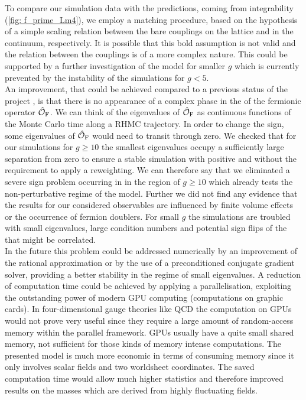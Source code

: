To compare our simulation data with the predictions, coming from integrability (\autoref{fig: f_prime_Lm4}), we employ a matching procedure, based on the hypothesis of a simple scaling relation between the bare couplings on the lattice and in the continuum, respectively. It is possible that this bold assumption is not valid and the relation between the couplings is of a more complex nature. This could be supported by a further investigation of the model for smaller $g$ which is currently prevented by the instability of the simulations for $g <5$.\\
An improvement, that could be achieved compared to a previous status of the project \cite{Bianchi:2016cyv}, is that there is no appearance of a complex phase in the  of the fermionic operator $\hat{\mathcal{O}}_{\rm F}$. We can think of the eigenvalues of $\hat{\mathcal{O}}_{\rm F}$ as continuous functions of the Monte Carlo time along a RHMC trajectory. In order to change the  sign, some eigenvalues of $\hat{\mathcal{O}}_{\rm F}$ would need to transit through zero. We checked that for our simulations for $g \geq 10$ the smallest eigenvalues occupy a sufficiently large separation from zero to ensure  a stable simulation with positive  and without the requirement to apply a reweighting. We can therefore say that we eliminated a severe sign problem occurring  in \cite{Bianchi:2016cyv} in the region of $g\geq 10$ which already tests the non-perturbative regime of the model. Further we did not find any evidence that the results for our considered observables are influenced by finite volume effects or  the occurrence of fermion doublers. For small $g$ the simulations are troubled with small eigenvalues, large condition numbers and potential sign flips of the  that might be correlated.\\
In the future this problem could be addressed numerically by an improvement of the rational approximation or by the use of a preconditioned conjugate gradient solver, providing a better stability in the regime of small eigenvalues. A reduction of computation time could be achieved by applying a parallelisation, exploiting the outstanding power of modern GPU computing (computations  on graphic cards). In four-dimensional gauge theories like QCD the computation on GPUs would not prove very useful since they require a large amount of random-access memory within the parallel framework. GPUs usually have a quite small shared memory, not sufficient for those kinds of memory intense computations. The presented model is much more economic in terms of consuming memory since it only involves scalar fields and two worldsheet coordinates. The saved computation time would allow much higher statistics and therefore improved results on the masses which are derived from highly fluctuating fields. \\
